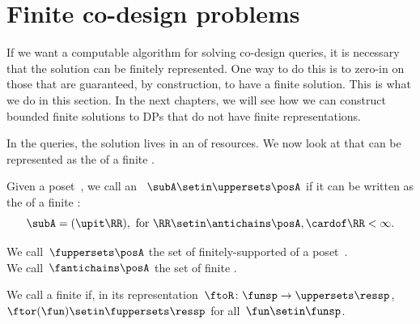 \section{Finite co-design problems}

If we want a computable algorithm for solving co-design queries, it is necessary that the solution can be finitely represented.
One way to do this is to zero-in on those  that are guaranteed, by construction, to have a finite solution.
This is what we do in this section.
In the next chapters, we will see how we can construct bounded finite solutions to DPs that do not have finite representations.

In the \FixFunMinRes queries, the solution lives in an  of resources.
We now look at  that can be represented as the  of a finite .

\begin{definition}
    \label{def:fuppersets}
    Given a poset~\posA, we call an ~$\subA \setin \uppersets \posA$ 
    if it can be written as the  of a finite :
    \begin{equation}
        \subA = (\upit\RR), \text{ for } \RR \setin \antichains \posA, \cardof\RR < \infty.
    \end{equation}
\end{definition}

We call~$\fuppersets \posA$ the set of finitely-supported  of a poset~\posA.
\\
We call~$\fantichains \posA$ the set of finite .

\begin{definition}
    \label{def:finite-design-problem}
    We call a  finite if, in its representation~$\ftoR \colon \funsp \to \uppersets \ressp$,
    ~$\ftor(\fun) \setin \fuppersets\ressp$ for all~$\fun\setin\funsp$.
\end{definition}

